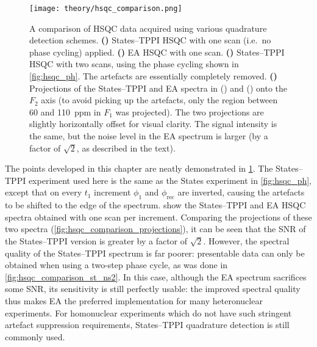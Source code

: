\begin{figure}[htbp]
    \centering
    \texttt{[image: theory/hsqc\_comparison.png]}%
    {\label{fig:hsqc_comparison_st_ns1}}%
    {\label{fig:hsqc_comparison_ea_ns1}}%
    {\label{fig:hsqc_comparison_st_ns2}}%
    {\label{fig:hsqc_comparison_projections}}%
    \caption[Experimental comparison of States--TPPI and echo--antiecho HSQC]{
        A comparison of HSQC data acquired using various quadrature detection schemes.
        \textbf{()} States--TPPI HSQC with one scan (i.e.\ no phase cycling) applied.
        \textbf{()} EA HSQC with one scan.
        \textbf{()} States--TPPI HSQC with two scans, using the phase cycling shown in \cref{fig:hsqc_ph}. The artefacts are essentially completely removed.
        \textbf{()} Projections of the States--TPPI and EA spectra in () and () onto the $F_2$ axis (to avoid picking up the artefacts, only the region between 60 and \qty{110}{ppm} in $F_1$ was projected).
        The two projections are slightly horizontally offset for visual clarity.
        The signal intensity is the same, but the noise level in the EA spectrum is larger (by a factor of $\sqrt{2}$, as described in the text).
    }
    \label{fig:hsqc_comparison}
\end{figure}

The points developed in this chapter are neatly demonstrated in \cref{fig:hsqc_comparison}.
The States--TPPI experiment used here is the same as the States experiment in \cref{fig:hsqc_ph}, except that on every $t_1$ increment $\phi_1$ and $\phi_\text{rec}$ are inverted, causing the artefacts to be shifted to the edge of the spectrum.
 show the States--TPPI and EA HSQC spectra obtained with one scan per increment.
Comparing the projections of these two spectra (\cref{fig:hsqc_comparison_projections}), it can be seen that the SNR of the States--TPPI version is greater by a factor of $\sqrt{2}$.
However, the spectral quality of the States--TPPI spectrum is far poorer: presentable data can only be obtained when using a two-step phase cycle, as was done in \cref{fig:hsqc_comparison_st_ns2}.
In this case, although the EA spectrum sacrifices some SNR, its sensitivity is still perfectly usable: the improved spectral quality thus makes EA the preferred implementation for many heteronuclear experiments.
For homonuclear experiments which do not have such stringent artefact suppression requirements, States--TPPI quadrature detection is still commonly used.


